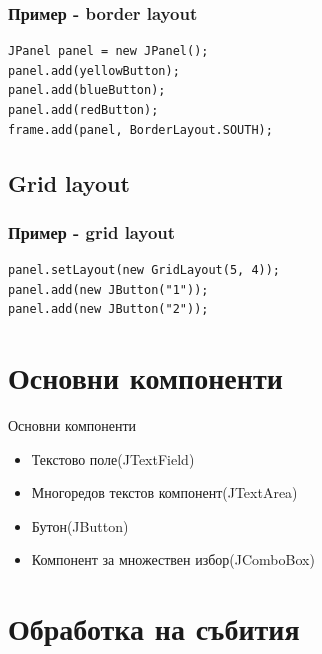 \documentclass{beamer}
\begin{document}
\begin{frame}[fragile]
  \frametitle{Пример - border layout}
  \transdissolve
\begin{lstlisting}
JPanel panel = new JPanel();
panel.add(yellowButton);
panel.add(blueButton);
panel.add(redButton);
frame.add(panel, BorderLayout.SOUTH);  
\end{lstlisting}
\end{frame}

\subsection{Grid layout}
\begin{frame}[fragile]
  \frametitle{Пример - grid layout}
  \transdissolve
\begin{lstlisting}
panel.setLayout(new GridLayout(5, 4));
panel.add(new JButton("1"));
panel.add(new JButton("2"));  
\end{lstlisting}
\end{frame}

\section{Основни компоненти}

\begin{frame}{Основни компоненти}
  \transdissolve
  \begin{itemize}
  \item Текстово поле(JTextField)
  \item Многоредов текстов компонент(JTextArea)
  \item Бутон(JButton)
  \item Компонент за множествен избор(JComboBox)
  \end{itemize}
\end{frame}

\section{Обработка на събития}
\end{document}

